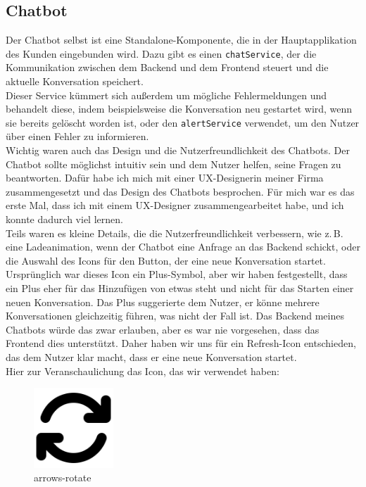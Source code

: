 \pagebreak
\subsection{Chatbot}\label{sec:umsetzung_chatbot}
Der Chatbot selbst ist eine Standalone-Komponente, die in der Hauptapplikation des Kunden eingebunden wird. Dazu gibt es einen \lstinline|chatService|,  
der die Kommunikation zwischen dem Backend und dem Frontend steuert und die aktuelle Konversation speichert.\\  
Dieser Service kümmert sich außerdem um mögliche Fehlermeldungen und behandelt diese, indem beispielsweise die Konversation neu gestartet wird, wenn sie  
bereits gelöscht worden ist, oder den \lstinline|alertService| verwendet, um den Nutzer über einen Fehler zu informieren.\\  
Wichtig waren auch das Design und die Nutzerfreundlichkeit des Chatbots. Der Chatbot sollte möglichst intuitiv sein und dem Nutzer helfen, seine Fragen zu beantworten.  
Dafür habe ich mich mit einer UX-Designerin meiner Firma zusammengesetzt und das Design des Chatbots besprochen.  
Für mich war es das erste Mal, dass ich mit einem UX-Designer zusammengearbeitet habe, und ich konnte dadurch viel lernen.\\  
Teils waren es kleine Details, die die Nutzerfreundlichkeit verbessern, wie z.\,B. eine Ladeanimation, wenn der Chatbot eine Anfrage an das Backend schickt,  
oder die Auswahl des Icons für den Button, der eine neue Konversation startet.\\  
Ursprünglich war dieses Icon ein Plus-Symbol, aber wir haben festgestellt, dass ein Plus eher für das Hinzufügen von etwas steht und nicht für das Starten einer neuen Konversation.  
Das Plus suggerierte dem Nutzer, er könne mehrere Konversationen gleichzeitig führen, was nicht der Fall ist.  
Das Backend meines Chatbots würde das zwar erlauben, aber es war nie vorgesehen, dass das Frontend dies unterstützt.  
Daher haben wir uns für ein Refresh-Icon entschieden, das dem Nutzer klar macht, dass er eine neue Konversation startet.\\  

Hier zur Veranschaulichung das Icon, das wir verwendet haben: \cite{fontawesome:refresh}\\  
\begin{figure}[H]
    \begin{center}
        \includegraphics[width=3cm]{bilder/arrows-rotate-solid.png}
        \caption{arrows-rotate}\label{fig:refresh_fontawesome}
    \end{center}
\end{figure}